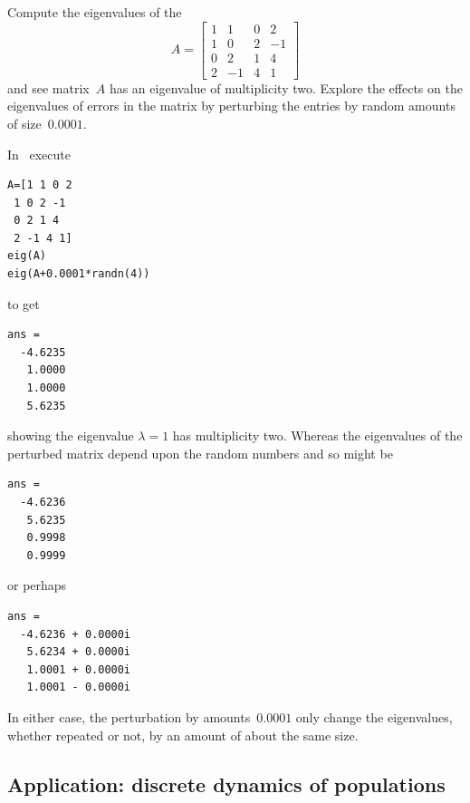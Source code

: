 \begin{example} \label{eg:}
Compute the eigenvalues of the 
\begin{equation*}
A=\begin{bmatrix}1&1&0&2
\\1&0&2&-1
\\0&2&1&4
\\2&-1&4&1\end{bmatrix}
\end{equation*}
and see matrix~\(A\) has an eigenvalue of multiplicity two.  
Explore the effects on the eigenvalues of errors in the matrix by perturbing the entries by random amounts of size~\(0.0001\).
\begin{solution} 
In \script\ execute
\begin{verbatim}
A=[1 1 0 2
 1 0 2 -1
 0 2 1 4
 2 -1 4 1]
eig(A)
eig(A+0.0001*randn(4))
\end{verbatim}
\setbox\ajrqrbox\hbox{}%
\marginpar{\usebox{\ajrqrbox}}%
to get
\begin{verbatim}
ans =
  -4.6235
   1.0000
   1.0000
   5.6235
\end{verbatim}
showing the eigenvalue \(\lambda=1\) has multiplicity two.
Whereas the eigenvalues of the perturbed matrix depend upon the random numbers and so might be
\begin{verbatim}
ans =
  -4.6236
   5.6235
   0.9998
   0.9999
\end{verbatim}
or perhaps
\begin{verbatim}
ans =
  -4.6236 + 0.0000i
   5.6234 + 0.0000i
   1.0001 + 0.0000i
   1.0001 - 0.0000i
\end{verbatim}
In either case, the perturbation by amounts~\(0.0001\) only change the eigenvalues, whether repeated or not, by an amount of about the same size.
\end{solution}
\end{example}











\subsection{Application: discrete dynamics of populations}
\label{sec:ddp}

